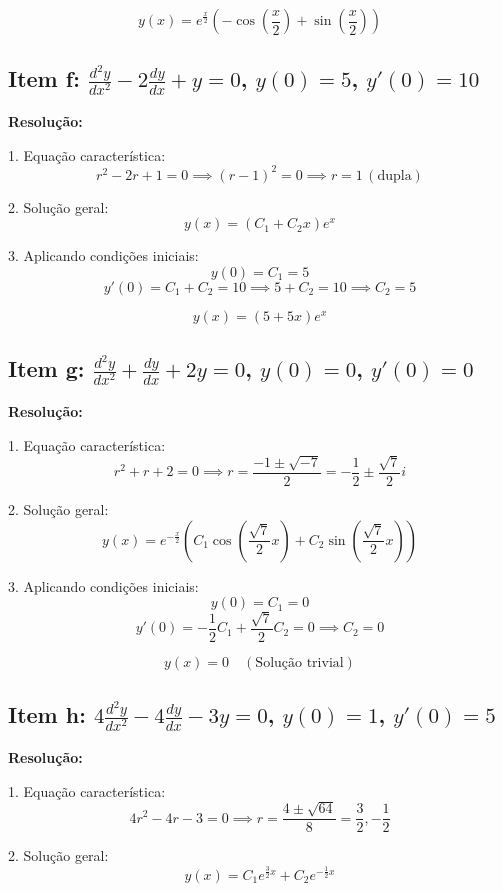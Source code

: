 \documentclass[12pt,a4paper]{article}
\begin{document}
\[
\boxed{y(x) = e^{\frac{x}{2}}\left(-\cos\left(\frac{x}{2}\right) + \sin\left(\frac{x}{2}\right)\right)}
\]

\subsection*{Item f: \(\frac{d^2 y}{dx^2} - 2\frac{dy}{dx} + y = 0\), \(y(0) = 5\), \(y'(0) = 10\)}

\textbf{Resolução:}

1. Equação característica:
\[
r^2 - 2r + 1 = 0 \implies (r-1)^2 = 0 \implies r = 1 \, (\text{dupla})
\]

2. Solução geral:
\[
y(x) = (C_1 + C_2 x)e^{x}
\]

3. Aplicando condições iniciais:
\[
y(0) = C_1 = 5
\]
\[
y'(0) = C_1 + C_2 = 10 \implies 5 + C_2 = 10 \implies C_2 = 5
\]

\[
\boxed{y(x) = (5 + 5x)e^{x}}
\]

\subsection*{Item g: \(\frac{d^2 y}{dx^2} + \frac{dy}{dx} + 2y = 0\), \(y(0) = 0\), \(y'(0) = 0\)}

\textbf{Resolução:}

1. Equação característica:
\[
r^2 + r + 2 = 0 \implies r = \frac{-1 \pm \sqrt{-7}}{2} = -\frac{1}{2} \pm \frac{\sqrt{7}}{2}i
\]

2. Solução geral:
\[
y(x) = e^{-\frac{x}{2}}\left(C_1 \cos\left(\frac{\sqrt{7}}{2}x\right) + C_2 \sin\left(\frac{\sqrt{7}}{2}x\right)\right)
\]

3. Aplicando condições iniciais:
\[
y(0) = C_1 = 0
\]
\[
y'(0) = -\frac{1}{2}C_1 + \frac{\sqrt{7}}{2}C_2 = 0 \implies C_2 = 0
\]

\[
\boxed{y(x) = 0} \quad (\text{Solução trivial})
\]

\subsection*{Item h: \(4\frac{d^2 y}{dx^2} - 4\frac{dy}{dx} - 3y = 0\), \(y(0) = 1\), \(y'(0) = 5\)}

\textbf{Resolução:}

1. Equação característica:
\[
4r^2 - 4r - 3 = 0 \implies r = \frac{4 \pm \sqrt{64}}{8} = \frac{3}{2}, -\frac{1}{2}
\]

2. Solução geral:
\[
y(x) = C_1 e^{\frac{3}{2}x} + C_2 e^{-\frac{1}{2}x}
\]
\end{document}

